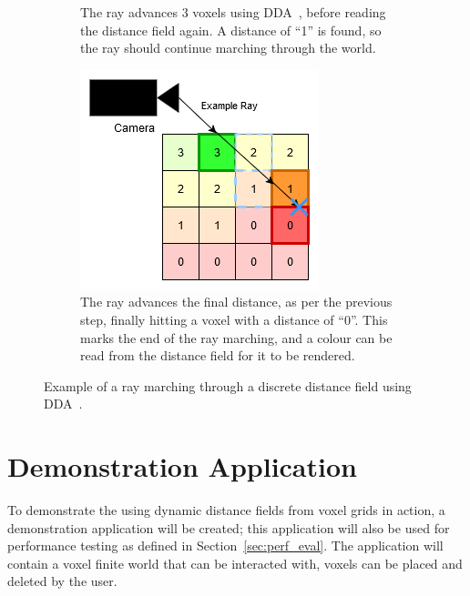 \begin{figure}[htbp]
\begin{subfigure}[t]{0.32\textwidth}
        \caption{The ray advances 3 voxels using DDA~\protect\cite{amanatides1987fast}, before reading the distance
            field again. A distance of ``1'' is found, so the ray should continue marching through the world.}
    \end{subfigure}
    \hfill
    \begin{subfigure}[t]{0.32\textwidth}
        \centering
        \includegraphics[width=\textwidth]{figures/df_dda_3.drawio.png}
        \caption{The ray advances the final distance, as per the previous step, finally hitting a voxel with a distance
            of ``0''. This marks the end of the ray marching, and a colour can be read from the distance field for it to
            be rendered.}
    \end{subfigure}
    \caption{Example of a ray marching through a discrete distance field using DDA~\protect\cite{amanatides1987fast}.}
    \label{fig:df_dda}
\end{figure}

\section{Demonstration Application} \label{sec:demo_app}
To demonstrate the using dynamic distance fields from voxel grids in action, a demonstration application will be
created; this application will also be used for performance testing as defined in Section~\ref{sec:perf_eval}. The
application will contain a voxel finite world that can be interacted with, voxels can be placed and deleted by the user.

